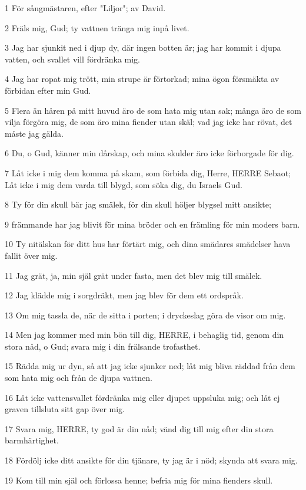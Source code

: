 \par 1 För sångmästaren, efter "Liljor"; av David.
\par 2 Fräls mig, Gud; ty vattnen tränga mig inpå livet.
\par 3 Jag har sjunkit ned i djup dy, där ingen botten är; jag har kommit i djupa vatten, och svallet vill fördränka mig.
\par 4 Jag har ropat mig trött, min strupe är förtorkad; mina ögon försmäkta av förbidan efter min Gud.
\par 5 Flera än håren på mitt huvud äro de som hata mig utan sak; många äro de som vilja förgöra mig, de som äro mina fiender utan skäl; vad jag icke har rövat, det måste jag gälda.
\par 6 Du, o Gud, känner min dårskap, och mina skulder äro icke förborgade för dig.
\par 7 Låt icke i mig dem komma på skam, som förbida dig, Herre, HERRE Sebaot; Låt icke i mig dem varda till blygd, som söka dig, du Israels Gud.
\par 8 Ty för din skull bär jag smälek, för din skull höljer blygsel mitt ansikte;
\par 9 främmande har jag blivit för mina bröder och en främling för min moders barn.
\par 10 Ty nitälskan för ditt hus har förtärt mig, och dina smädares smädelser hava fallit över mig.
\par 11 Jag grät, ja, min själ grät under fasta, men det blev mig till smälek.
\par 12 Jag klädde mig i sorgdräkt, men jag blev för dem ett ordspråk.
\par 13 Om mig tassla de, när de sitta i porten; i dryckeslag göra de visor om mig.
\par 14 Men jag kommer med min bön till dig, HERRE, i behaglig tid, genom din stora nåd, o Gud; svara mig i din frälsande trofasthet.
\par 15 Rädda mig ur dyn, så att jag icke sjunker ned; låt mig bliva räddad från dem som hata mig och från de djupa vattnen.
\par 16 Låt icke vattensvallet fördränka mig eller djupet uppsluka mig; och låt ej graven tillsluta sitt gap över mig.
\par 17 Svara mig, HERRE, ty god är din nåd; vänd dig till mig efter din stora barmhärtighet.
\par 18 Fördölj icke ditt ansikte för din tjänare, ty jag är i nöd; skynda att svara mig.
\par 19 Kom till min själ och förlossa henne; befria mig för mina fienders skull.
